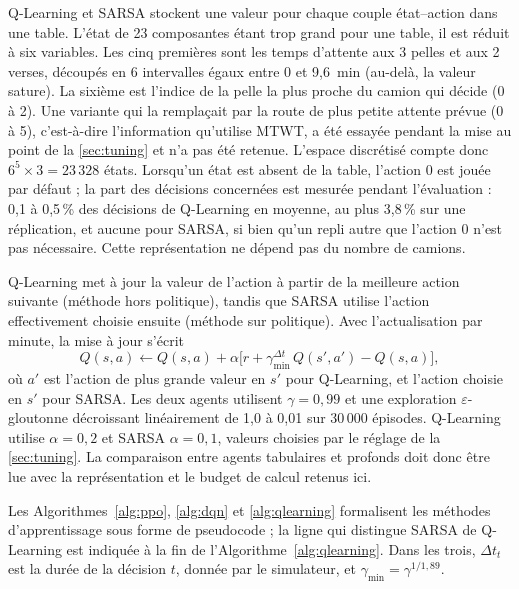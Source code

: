 \documentclass[11pt,a4paper]{article}
\newif\ifrevmarks
\newcommand{\revtag}[1]{\ifrevmarks\textsuperscript{\textcolor{red!70!black}{\scriptsize[#1]}}\fi}
\newcommand{\rev}[2]{\ifrevmarks{\color{revcolor}#2}\revtag{#1}\else#2\fi}
\newenvironment{revbloc}[1]{\par\ifrevmarks\color{revcolor}\noindent\revtag{#1}\ \fi}{\par}
\newif\ifcorrmarks
\newcommand{\corr}[1]{\ifcorrmarks\textcolor{corrcolor}{#1}\else#1\fi}
\begin{document}
\begin{revbloc}{M8, v3}
Q-Learning \cite{WatkinsDayan1992} et SARSA \cite{RummeryNiranjan1994} stockent une valeur pour chaque couple état--action dans une table. L'état de 23 composantes étant trop grand pour une table, il est réduit à six variables. Les cinq premières sont les temps d'attente aux 3 pelles et aux 2 verses, découpés en 6 intervalles égaux entre 0 et 9,6~min (au-delà, la valeur sature). La sixième est l'indice de la pelle la plus proche du camion qui décide (0 à 2). Une variante qui la remplaçait par la route de plus petite attente prévue (0 à 5), c'est-à-dire l'information qu'utilise MTWT, a été essayée pendant la mise au point de la \cref{sec:tuning} et n'a pas été retenue. L'espace discrétisé compte donc $6^5 \times 3 = 23\,328$ états. Lorsqu'un état est absent de la table, l'action 0 est jouée par défaut ; la part des décisions concernées est mesurée pendant l'évaluation \corr{: 0,1 à 0,5\,\% des décisions de Q-Learning en moyenne, au plus 3,8\,\% sur une réplication, et aucune pour SARSA, si bien qu'un repli autre que l'action 0 n'est pas nécessaire}. Cette représentation ne dépend pas du nombre de camions.

Q-Learning met à jour la valeur de l'action à partir de la meilleure action suivante (méthode hors politique), tandis que SARSA utilise l'action effectivement choisie ensuite (méthode sur politique). Avec l'actualisation par minute, la mise à jour s'écrit
\begin{equation}
Q(s,a) \leftarrow Q(s,a) + \alpha \big[ r + \gamma_{\min}^{\Delta t}\, Q(s',a') - Q(s,a) \big] ,
\end{equation}
où $a'$ est l'action de plus grande valeur en $s'$ pour Q-Learning, et l'action choisie en $s'$ pour SARSA. Les deux agents utilisent $\gamma = 0{,}99$ et une exploration $\varepsilon$-gloutonne décroissant linéairement de 1,0 à 0,01 sur 30\,000 épisodes. Q-Learning utilise $\alpha = 0{,}2$ et SARSA $\alpha = 0{,}1$, valeurs choisies par le réglage de la \cref{sec:tuning}. La comparaison entre agents tabulaires et profonds doit donc être lue avec la représentation et le budget de calcul retenus ici.
\end{revbloc}

Les Algorithmes~\ref{alg:ppo}, \ref{alg:dqn} et \ref{alg:qlearning} formalisent les méthodes d'apprentissage sous forme de pseudocode ; la ligne qui distingue SARSA de Q-Learning est indiquée à la fin de l'Algorithme~\ref{alg:qlearning}. \rev{v3}{Dans les trois, $\Delta t_t$ est la durée de la décision $t$, donnée par le simulateur, et $\gamma_{\min} = \gamma^{1/1{,}89}$.}
\end{document}
